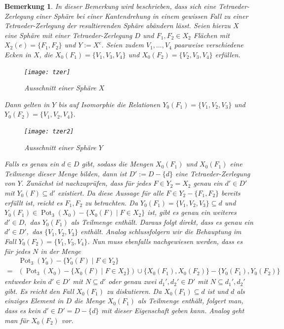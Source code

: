 \documentclass[12pt,titlepage,twoside,cleardoublepage]{article}
\theoremstyle{nummermitklammern}
\newtheorem{bemerkung}[temp]{Bemerkung}
\newtheorem{bemerkung}[zahl]{Bemerkung}
\numberwithin{equation}{section}
\DeclareMathOperator{\Pot}{Pot}
\begin{document}
\begin{bemerkung}\label{tzer}
In dieser Bemerkung wird beschrieben, dass sich eine Tetraeder-Zerlegung einer Sphäre bei einer Kantendrehung in einem gewissen Fall zu einer Tetraeder-Zerlegung der resultierenden Sphäre abändern lässt. Seien hierzu $X$ eine Sphäre mit einer Tetraeder-Zerlegung $D$ und $F_1,F_2\in X_2$ Flächen mit $X_2(e)=\{F_1,F_2\}$ und $Y:=X^e.$ Seien zudem $V_1,\ldots,V_4$ paarweise verschiedene Ecken in $X$, die $X_0(F_1)=\{V_1,V_3,V_4\}$ und $X_0(F_2)=\{V_2,V_3,V_4\}$ erfüllen.
 \begin{figure}[H]
\begin{center}
\texttt{[image: tzer]}
\end{center}
\caption{Ausschnitt einer Sphäre $X$}
\end{figure}
 
 Dann gelten in $Y$ bis auf Isomorphie die Relationen ${Y}_0(F_1)=\{V_1,V_2,V_3\}$ und ${Y}_0(F_2)=\{V_1,V_2,V_4\}.$
 \begin{figure}[H]
\begin{center}
\texttt{[image: tzer2]}
\end{center}
\caption{Ausschnitt einer Sphäre $Y$}
\end{figure}
Falls es genau ein $d\in D$ gibt, sodass die Mengen ${X}_0(F_1)$ und ${X}_0(F_1)$ eine Teilmenge dieser Menge bilden, dann ist $D':=D-\{d\}$ eine Tetraeder-Zerlegung von $Y.$ Zunächst ist nachzuprüfen, dass für jedes $F\in {Y}_2=X_2$ genau ein $d'\in D'$ mit ${Y}_0(F)\subseteq d'$ existiert. Da diese Aussage für alle $F\in Y_2-\{ F_1,F_2\}$ bereits erfüllt ist, reicht es $F_1,F_2$ zu betrachten. Da ${Y}_0(F_1)=\{V_1,V_2,V_3\}\subseteq d$ und  $Y_0(F_1) \in \Pot_3(X_0)-\{X_0(F)\mid F\in X_2\}$ ist, gibt es genau ein weiteres $d'\in D,$ das ${Y}_0(F_1)$ als Teilmenge enthält. Daraus folgt direkt, dass es genau ein $d'\in D',$ das $\{V_1,V_2,V_3\}$ enthält. Analog schlussfolgern wir die Behauptung im Fall ${Y}_0(F_2)=\{V_1,V_3,V_4\}$.
Nun muss ebenfalls nachgewiesen werden, dass es für jedes $N$ in der Menge 
\begin{align*}
 &\Pot_3({Y}_0)-\{{Y}_0(F)\mid F\in {Y}_2\}\\
 =& (\Pot_3({X}_0)-\{{X}_0(F)\mid F\in {X}_2\})\cup \{X_0(F_1),X_0(F_2)\}-\{{Y}_0(F_1),{Y}_0(F_2)\}
 \end{align*}
  entweder kein $d'\in D'$ mit $N\subseteq d'$ 
  oder genau zwei $d_1',d_2'\in D'$ mit $N\subseteq d_1',d_2'$ gibt. 
  Es reicht den Fall $X_0(F_1)$ zu diskutieren. Da $X_0(F_1)\subseteq d$ ist und $d$ als einziges Element in $D$ die Menge $X_0(F_1)$ als Teilmenge enthält, folgert man, dass es kein $d'\in D'=D-\{d\}$ mit dieser Eigenschaft geben kann. Analog geht man für $X_0(F_2) $ vor.
\end{bemerkung}
\end{document}
